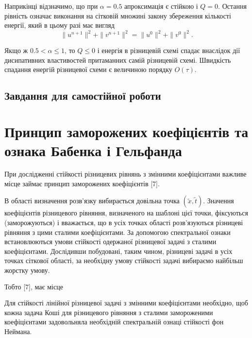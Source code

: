 Наприкінці відзначимо, що при $\alpha = 0.5$ апроксимація є стійкою і $Q = 0$. Остання рівність означає виконання на сітковій множині закону збереження кількості енергії, який в цьому разі має вигляд
\begin{equation*}
    \|u^{n+1}\|^2 + \|v^{n+1}\|^2 = \|u^0\|^2 + \|v^0\|^2.
\end{equation*}

Якщо ж $0.5 < \alpha \le 1$, то $Q \le 0$ і енергія в різницевій схемі спадає внаслідок дії дисипативних властивостей притаманних самій різницевій схемі. Швидкість спадання енергій різницевої схеми є величиною порядку $O(\tau)$.

\subsection{Завдання для самостійної роботи}


\section{Принцип заморожених коефіцієнтів та ознака Бабенка і Гельфанда}

При дослідженні стійкості різницевих рівнянь з змінними коефіцієнтами важливе місце займає принцип заморожених коефіцієнтів [7]. \medskip

В області визначення розв'язку вибирається довільна точка $(\tilde x, \tilde t)$. Значення коефіцієнтів різницевого рівняння, визначеного на шаблоні цієї точки, фіксуються (заморожуються) і вважається, що в усіх точках області розв'язуються різницеві рівняння з цими сталими коефіцієнтами. За допомогою спектральної ознаки встановлюються умови стійкості одержаної різницевої задачі з сталими коефіцієнтами. Дослідивши побудовані, таким чином, різницеві задачі в усіх точках сіткової області, за необхідну умову стійкості задачі вибираємо найбільш жорстку умову.  \medskip

Тобто [7], має місце 

\begin{proposition}
    Для стійкості лінійної різницевої задачі з змінними коефіцієнтами необхідно, щоб кожна задача Коші для різницевого рівняння з сталими замороженими коефіцієнтами задовольняла необхідній спектральній ознаці стійкості фон Неймана. 
\end{proposition}

